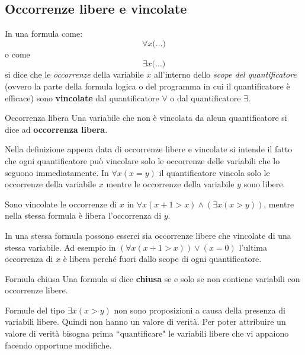 \subsection{Occorrenze libere e vincolate}
In una formula come:
\[
\forall x \bigl( \ldots \bigr)
\]
o come
\[
\exists x \bigl( \ldots \bigr)
\]
si dice che le \textit{occorrenze} della variabile $x$ all'interno dello \textit{scope del quantificatore} (ovvero la parte della formula logica o del programma in cui il quantificatore è efficace) sono \textbf{vincolate} dal quantificatore $\forall$ o dal quantificatore $\exists$.

\begin{defbox}{Occorrenza libera}
	Una variabile che non è vincolata da alcun quantificatore si dice ad \textbf{occorrenza libera}.
\end{defbox}

\begin{example}
	Nella definizione appena data di occorrenze libere e vincolate si intende il fatto che ogni quantificatore può vincolare solo le occorrenze delle variabili che lo seguono immediatamente. In $\forall x (x=y)$ il quantificatore vincola solo le occorrenze della variabile $x$ mentre le occorrenze della variabile $y$ sono libere.
\end{example}

\begin{example}
	Sono vincolate le occorrenze di $x$ in $\forall x(x+1>x) \land (\exists x(x>y))$, mentre nella stessa formula è libera l'occorrenza di $y$.
\end{example}

\begin{example}
	In una stessa formula possono esserci sia occorrenze libere che vincolate di una stessa variabile. Ad esempio in $(\forall x(x+1>x))\lor(x=0)$ l'ultima occorrenza di $x$ è libera perché fuori dallo scope di ogni quantificatore.
\end{example}

\begin{defbox}{Formula chiusa}
	Una formula si dice \textbf{chiusa} se e solo se non contiene variabili con occorrenze libere.
\end{defbox}

\begin{example}
	Formule del tipo $\exists x(x>y)$ non sono proposizioni a causa della presenza di variabili libere. Quindi non hanno un valore di verità. Per poter attribuire un valore di verità bisogna prima ``quantificare" le variabili libere che vi appaiono facendo opportune modifiche.
\end{example}

